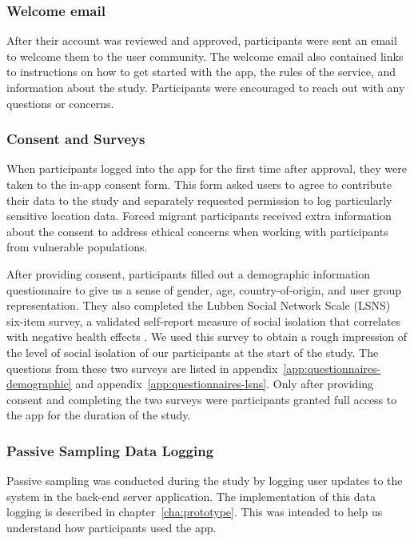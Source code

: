 \subsubsection*{Welcome email}

After their account was reviewed and approved, participants were sent an email to welcome them to the user community. The welcome email also contained links to instructions on how to get started with the app, the rules of the service, and information about the study. Participants were encouraged to reach out with any questions or concerns.

\subsubsection*{Consent and Surveys}

When participants logged into the app for the first time after approval, they were taken to the in-app consent form. This form asked users to agree to contribute their data to the study and separately requested permission to log particularly sensitive location data. Forced migrant participants received extra information about the consent to address ethical concerns when working with participants from vulnerable populations.

After providing consent, participants filled out a demographic information questionnaire to give us a sense of gender, age, country-of-origin, and user group representation. They also completed the Lubben Social Network Scale (LSNS) six-item survey, a validated self-report measure of social isolation that correlates with negative health effects \cite{chang_validation_2018}. We used this survey to obtain a rough impression of the level of social isolation of our participants at the start of the study. The questions from these two surveys are listed in appendix~\ref{app:questionnaires-demographic} and appendix~\ref{app:questionnaires-lsns}. Only after providing consent and completing the two surveys were participants granted full access to the app for the duration of the study.

\subsubsection*{Passive Sampling Data Logging}
\label{sec:passive_sampling}

Passive sampling was conducted during the study by logging user updates to the system in the back-end server application. The implementation of this data logging is described in chapter~\ref{cha:prototype}. This was intended to help us understand how participants used the app.

